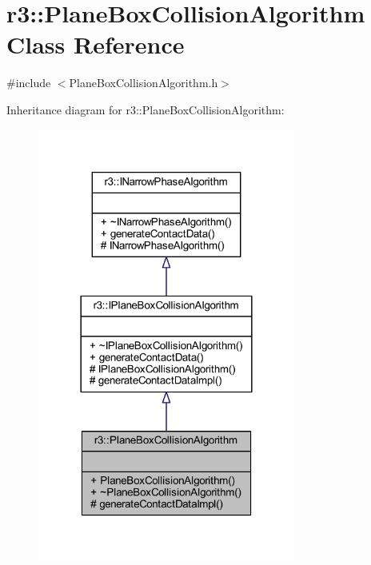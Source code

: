 \hypertarget{classr3_1_1_plane_box_collision_algorithm}{}\section{r3\+:\+:Plane\+Box\+Collision\+Algorithm Class Reference}
\label{classr3_1_1_plane_box_collision_algorithm}


{\ttfamily \#include $<$Plane\+Box\+Collision\+Algorithm.\+h$>$}



Inheritance diagram for r3\+:\+:Plane\+Box\+Collision\+Algorithm\+:\nopagebreak
\begin{figure}[H]
\begin{center}
\leavevmode
\includegraphics[width=240pt]{classr3_1_1_plane_box_collision_algorithm__inherit__graph}
\end{center}
\end{figure}


